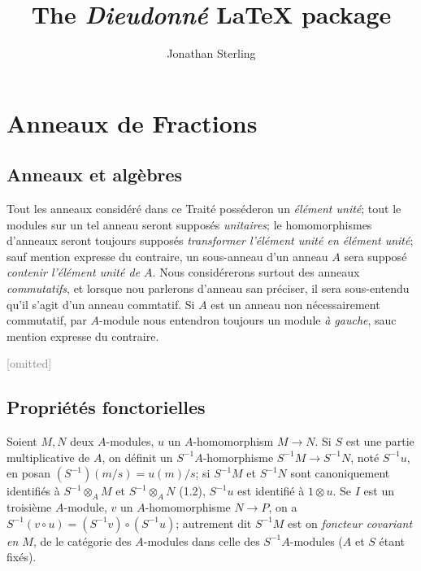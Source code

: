 \documentclass[oneside,french,article]{memoir}
\title{The \emph{Dieudonn\'e} \LaTeX{} package}
\author{Jonathan Sterling}
\begin{document}
\maketitle

\tableofcontents

\clearpage


\section{Anneaux de Fractions}

\subsection{Anneaux et alg\`ebres}

\begin{node}
  Tout les anneaux consid\'er\'e dans ce Trait\'e poss\'ederon un
  \emph{\'el\'ement unit\'e}; tout le modules sur un tel anneau seront
  suppos\'es \emph{unitaires}; le homomorphismes d'anneaux seront toujours
  suppos\'es \emph{transformer l'\'el\'ement unit\'e en \'el\'ement unit\'e};
  sauf mention expresse du contraire, un sous-anneau d'un anneau $A$ sera
  suppos\'e \emph{contenir l'\'el\'ement unit\'e de $A$}. Nous consid\'ererons
  surtout des anneaux \emph{commutatifs}, et lorsque nou parlerons  d'anneau
  san pr\'eciser, il sera sous-entendu qu'il s'agit d'un anneau commtatif. Si
  $A$ est un anneau non n\'ecessairement commutatif, par $A$-module nous
  entendron toujours un module \emph{\`a gauche}, sauc mention expresse du
  contraire.
\end{node}

\textcolor{gray}{[omitted]}

\setcounter{subsection}{2}

\subsection{Propri\'et\'es fonctorielles}

\begin{node}
  Soient $M, N$ deux $A$-modules, $u$ un $A$-homomorphism $M\to N$. Si $S$ est
  une partie multiplicative de $A$, on d\'efinit un $S^{-1}A$-homorphisme
  $S^{-1}M\to S^{-1}N$, not\'e $S^{-1}u$, en posan $(S^{-1})(m/s) = u(m)/s$; si
  $S^{-1}M$ et $S^{-1}N$ sont canoniquement identifi\'es \`a
  $S^{-1}\otimes_{A}M$ et $S^{-1}\otimes_{A}N$ (1.2),
  $S^{-1}u$ est identifi\'e \`a $1\otimes u$. Se $I$ est un troisi\`eme
  $A$-module, $v$ un $A$-homomorphisme $N\to P$, on a $S^{-1}(v\circ u) =
  (S^{-1}v)\circ (S^{-1}u)$; autrement dit $S^{-1}M$ est on \emph{foncteur
  covariant en $M$}, de le cat\'egorie des $A$-modules dans celle des
  $S^{-1}A$-modules ($A$ et $S$ \'etant fix\'es).
\end{node}
\end{document}
